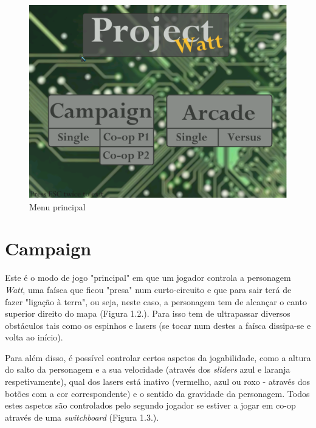 \documentclass{report}
\begin{document}
\begin{figure}[H]
	\includegraphics[width=\textwidth]{main_menu}
	\caption{Menu principal}
\end{figure}

\section{Campaign}

Este é o modo de jogo "principal" em que um jogador controla a personagem \textit{Watt}, uma faísca que ficou "presa" num curto-circuito e que para sair terá de fazer "ligação à terra", ou seja, neste caso, a personagem tem de alcançar o canto superior direito do mapa (Figura 1.2.\footnotemark). Para isso tem de ultrapassar diversos obstáculos tais como os espinhos e lasers (se tocar num destes a faísca dissipa-se e volta ao início).

Para além disso, é possível controlar certos aspetos da jogabilidade, como a altura do salto da personagem e a sua velocidade (através dos \textit{sliders} azul e laranja respetivamente), qual dos lasers está inativo (vermelho, azul ou roxo - através dos botões com a cor correspondente) e o sentido da gravidade da personagem. Todos estes aspetos são controlados pelo segundo jogador se estiver a jogar em co-op através de uma \textit{switchboard} (Figura 1.3.).
\end{document}
